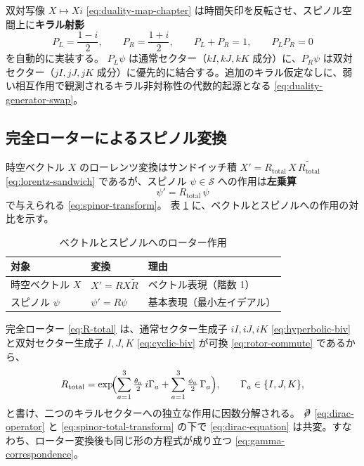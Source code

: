 \documentclass[dvipdfmx,a4paper,oneside]{jsbook}
\numberwithin{equation}{chapter}
\begin{document}
双対写像 \(X \mapsto X i\) \eqref{eq:duality-map-chapter} は時間矢印を反転させ、スピノル空間上に\textbf{キラル射影}
\begin{equation}
  P_L = \frac{1 - i}{2},
  \qquad
  P_R = \frac{1 + i}{2},
  \qquad
  P_L + P_R = 1,
  \qquad
  P_L P_R = 0
  \label{eq:chiral-projectors}
\end{equation}
を自動的に実装する。
\(P_L \psi\) は通常セクター（\(kI, kJ, kK\) 成分）に、\(P_R \psi\) は双対セクター（\(jI, jJ, jK\) 成分）に優先的に結合する。追加のキラル仮定なしに、弱い相互作用で観測されるキラル非対称性の代数的起源となる \eqref{eq:duality-generator-swap}。

\subsection{完全ローターによるスピノル変換}

時空ベクトル \(X\) のローレンツ変換はサンドイッチ積 \(X' = R_{\mathrm{total}}\, X\, \widetilde{R_{\mathrm{total}}}\) \eqref{eq:lorentz-sandwich} であるが、スピノル \(\psi \in \mathcal{S}\) への作用は\textbf{左乗算}
\begin{equation}
  \psi' = R_{\mathrm{total}}\,\psi
  \label{eq:spinor-total-transform}
\end{equation}
で与えられる \eqref{eq:spinor-transform}。
表 \ref{tab:vector-spinor-action} に、ベクトルとスピノルへの作用の対比を示す。

\begin{table}[htbp]
  \centering
  \caption{ベクトルとスピノルへのローター作用}
  \label{tab:vector-spinor-action}
  \begin{tabular}{@{}lll@{}}
    \toprule
    対象 & 変換 & 理由 \\
    \midrule
    時空ベクトル \(X\) & \(X' = R X \widetilde{R}\) & ベクトル表現（階数 1） \\
    スピノル \(\psi\) & \(\psi' = R \psi\) & 基本表現（最小左イデアル） \\
    \bottomrule
  \end{tabular}
\end{table}

完全ローター \eqref{eq:R-total} は、通常セクター生成子 \(iI, iJ, iK\) \eqref{eq:hyperbolic-biv} と双対セクター生成子 \(I, J, K\) \eqref{eq:cyclic-biv} が可換 \eqref{eq:rotor-commute} であるから、
\begin{equation}
  R_{\mathrm{total}}
  = \exp\!\Bigl(
    \sum_{a=1}^{3} \tfrac{\theta_a}{2}\, i\Gamma_a
    + \sum_{a=1}^{3} \tfrac{\phi_a}{2}\, \Gamma_a
  \Bigr),
  \qquad \Gamma_a \in \{I, J, K\},
  \label{eq:R-total-exp}
\end{equation}
と書け、二つのキラルセクターへの独立な作用に因数分解される。
\(\not\!\partial\) \eqref{eq:dirac-operator} と \eqref{eq:spinor-total-transform} の下で \eqref{eq:dirac-equation} は共変。すなわち、ローター変換後も同じ形の方程式が成り立つ \eqref{eq:gamma-correspondence}。
\end{document}
